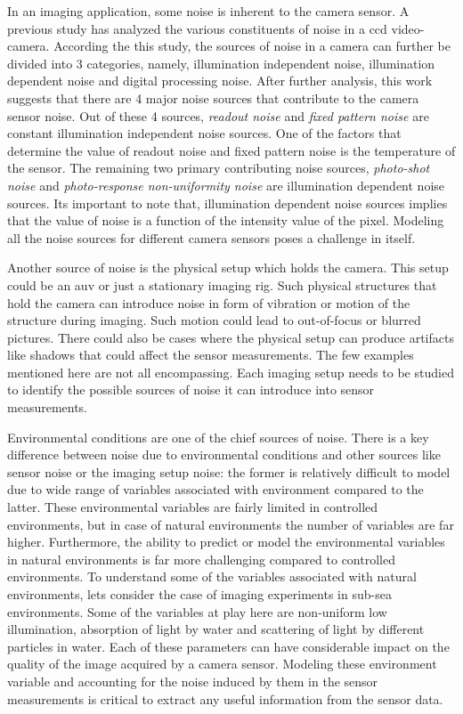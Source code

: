 \documentclass {udthesis}
\begin{document}
In an imaging application, some noise is inherent to the camera sensor. A previous study \cite{irie} has analyzed the various constituents of noise 
in a \gls{ccd} video-camera. According the this study, the sources of noise in a camera can further be divided into 3 categories, namely, illumination independent noise, illumination dependent noise and digital processing noise. After further analysis, this work suggests that there are 4 major noise sources that contribute to the camera sensor noise. Out of these 4 sources, \emph{readout noise} and \emph{fixed pattern noise} are constant illumination independent noise sources. One of the factors that determine the value of readout noise and fixed pattern noise is the temperature of the sensor. The remaining two primary contributing noise sources, \emph{photo-shot noise} and \emph{photo-response non-uniformity noise} are illumination dependent noise sources. Its important to note that, illumination dependent noise sources implies that the value of noise is a function of the intensity value of the pixel. Modeling all the noise sources for different camera sensors poses a challenge in itself.

Another source of noise is the physical setup which holds the camera. This setup could be an \gls{auv} or just a stationary imaging rig. Such physical structures that hold the camera can introduce noise in form of vibration or motion of the structure during imaging. Such motion could lead to out-of-focus or blurred pictures. There could also be cases where the physical setup can produce artifacts like shadows that could affect the sensor measurements. The few examples mentioned here are not all encompassing. Each imaging setup needs to be studied to identify the possible sources of noise it can introduce into sensor measurements.

Environmental conditions are one of the chief sources of noise. 
There is a key difference between noise due to environmental conditions 
and other sources like sensor noise or the imaging setup noise: the former is relatively difficult to model due to wide range of variables associated with environment compared to the latter. 
These environmental variables are fairly limited in controlled environments, but in case of natural environments
the number of variables are far higher. Furthermore, the ability to predict or model the environmental variables in natural
environments is far more challenging compared to controlled environments. To understand some of the variables associated with natural environments, lets consider the case of imaging experiments in sub-sea environments. 
Some of the variables at play here are non-uniform low illumination, absorption of light by water
and scattering of light by different particles in water. Each of these parameters can have considerable impact on the quality of the image acquired by
a camera sensor. Modeling these environment variable and accounting for the noise induced by them in the sensor measurements is critical to extract any useful
information from the sensor data.
\end{document}
